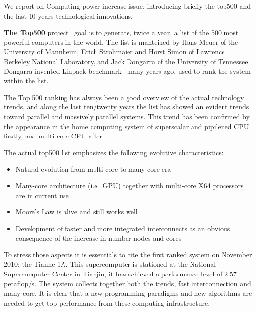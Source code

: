 We report on Computing power increase issue, introducing briefly the top500 and the last 10 years technological innovations.


{\bf The Top500} project~\cite{website:top500} goal is to generate, twice a year, a list of the 500 most powerful
computers in the world. The list is manteined by Hans Meuer 
of the University of Mannheim, Erich Strohmaier and Horst Simon of Lawrence Berkeley National 
Laboratory, and Jack Dongarra of the University of Tennessee. Dongarra invented
Linpack benchmark~\cite{linpackb} 
many years ago, used to rank the system within the list. 

The Top 500 ranking has always been a good overview of the actual technology
trends, and along the last ten/twenty years the list has showed an evident trends toward parallel and
massively parallel systems. This trend has been confirmed by the appearance in the home computing system of superscalar and pipilened 
CPU firstly, and multi-core CPU after. 


The actual top500 list emphasizes the following evolutive characteristics: 
\begin{itemize}
\item Natural evolution from multi-core to many-core era
\item Many-core architecture (i.e.\ GPU) together with multi-core X64 processors are in current use
\item Moore's Law is alive and still works well
\item Development of faster and more integrated interconnects as an obvious consequence of the increase in number nodes and cores 
\end{itemize}

To stress those aspects it is essentials to cite the first ranked system on November 2010: the Tianhe-1A. This 
supercomputer is stationed at the National Supercomputer Center in 
Tianjin, it has achieved a performance level of 2.57 petaflop/s. The system collects together both the trends, fast interconnection and
many-core, It is clear that a new programming paradigms and new algorithms are needed to get top performance  from these computing infrastructure.


